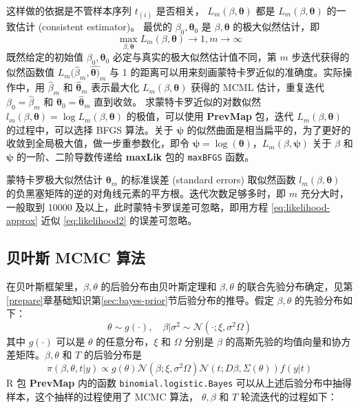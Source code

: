 \documentclass[12pt,a4paper,UTF8,twoside]{book}
\theoremstyle{definition}
\theoremstyle{definition}
\theoremstyle{definition}
\theoremstyle{remark}
\begin{document}
\noindent 这样做的依据是不管样本序列 \(t_{(i)}\) 是否相关，
\(L_{m}(\beta,\boldsymbol{\theta})\) 都是
\(L_{m}(\beta,\boldsymbol{\theta})\) 的一致估计 (consistent
estimator)\citep{PrevMap2017JSS}。 最优的
\(\beta_0,\boldsymbol{\theta}_0\) 是 \(\beta,\boldsymbol{\theta}\)
的极大似然估计，即 \[
\max_{\beta,\boldsymbol{\theta}}L_{m}(\beta,\boldsymbol{\theta}) \rightarrow 1, m \rightarrow\infty
\] \noindent 既然给定的初始值 \(\beta_{0},\boldsymbol{\theta}_{0}\)
必定与真实的极大似然估计值不同，第 \(m\) 步迭代获得的似然函数值
\(L_{m}(\hat{\beta}_{m}, \hat{\boldsymbol{\theta})}_{m}\) 与 1
的距离可以用来刻画蒙特卡罗近似的准确度。实际操作中，用
\(\hat{\beta}_{m}\) 和 \(\hat{\boldsymbol{\theta}}_{m}\) 表示最大化
\(L_{m}(\beta, \boldsymbol{\theta})\) 获得的 MCML 估计，重复迭代
\(\beta_{0} = \hat{\beta}_{m}\) 和
\(\boldsymbol{\theta}_{0} = \hat{\boldsymbol{\theta}}_{m}\) 直到收敛。
求蒙特卡罗近似的对数似然
\(l_{m}(\beta, \boldsymbol{\theta}) = \log L_{m}(\beta, \boldsymbol{\theta})\)
的极值，可以使用 \textbf{PrevMap} 包，迭代
\(L_{m}(\beta, \boldsymbol{\theta})\) 的过程中，可以选择 BFGS 算法。关于
\(\boldsymbol{\psi}\)
的似然曲面是相当扁平的，为了更好的收敛到全局极大值，做一步重参数化，即令
\(\boldsymbol{\psi} = \log(\boldsymbol{\theta})\)，\(L_{m}(\beta, \boldsymbol{\psi})\)
关于 \(\beta\) 和 \(\boldsymbol{\psi}\) 的一阶、二阶导数传递给
\textbf{maxLik} 包的 \texttt{maxBFGS} 函数。

蒙特卡罗极大似然估计 \(\boldsymbol{\theta}_{m}\) 的标准误差 (standard
errors) 取似然函数 \(l_{m}(\beta,\boldsymbol{\theta})\)
的负黑塞矩阵的逆的对角线元素的平方根。迭代次数足够多时，即 \(m\)
充分大时，一般取到 10000 及以上，此时蒙特卡罗误差可忽略，即用方程
\eqref{eq:likelihood-approx} 近似 \eqref{eq:likelihood2} 的误差可忽略。

\hypertarget{sec:MCMC}{%
\subsection{贝叶斯 MCMC 算法}\label{sec:MCMC}}

在贝叶斯框架里，\(\beta, \theta\) 的后验分布由贝叶斯定理和
\(\beta, \theta\)
的联合先验分布确定，见第\ref{prepare}章基础知识第\ref{sec:bayes-prior}节后验分布的推导。假定
\(\beta, \theta\) 的先验分布如下：
\[ \theta \sim  g(\cdot), \quad \beta | \sigma^2 \sim  \mathcal{N}(\cdot; \xi, \sigma^2 \Omega) \]
\noindent 其中 \(g(\cdot)\) 可以是 \(\theta\) 的任意分布，\(\xi\) 和
\(\Omega\) 分别是 \(\beta\)
的高斯先验的均值向量和协方差矩阵。\(\beta, \theta\) 和 \(T\)
的后验分布是 \begin{equation}
\pi(\beta, \theta, t | y) \propto g(\theta)\mathcal{N}(\beta; \xi, \sigma^2 \Omega)\mathcal{N}(t; D\beta, \Sigma(\theta))f(y|t) \label{eq:posterior}
\end{equation} \noindent R 包 \textbf{PrevMap} 内的函数
\texttt{binomial.logistic.Bayes}
可以从上述后验分布中抽得样本，这个抽样的过程使用了 MCMC 算法，
\(\theta, \beta\) 和 \(T\) 轮流迭代的过程如下：
\end{document}
